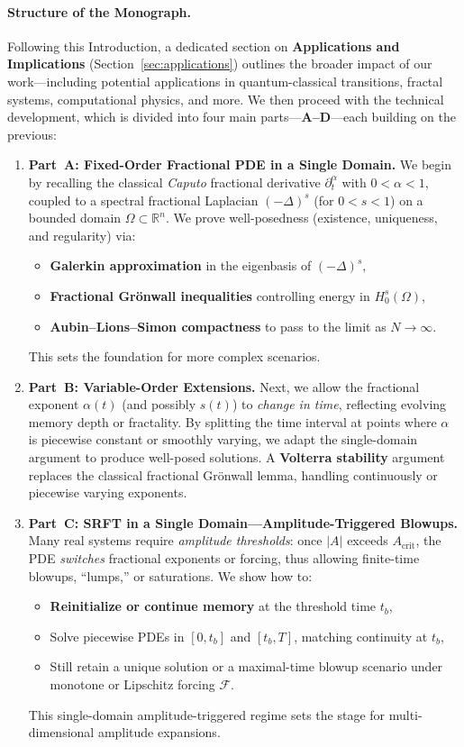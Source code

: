 \documentclass[12pt]{article}
\begin{document}
\paragraph{Structure of the Monograph.}
Following this Introduction, a dedicated section on \textbf{Applications and Implications} (Section~\ref{sec:applications}) outlines the broader impact of our work—including potential applications in quantum-classical transitions, fractal systems, computational physics, and more. We then proceed with the technical development, which is divided into four main parts—\textbf{A--D}—each building on the previous:

\begin{enumerate}
\item \textbf{Part~A: Fixed-Order Fractional PDE in a Single Domain.}
  We begin by recalling the classical \emph{Caputo} fractional derivative $\partial_t^\alpha$ 
  with $0<\alpha<1$, coupled to a spectral fractional Laplacian $(-\Delta)^s$ (for 
  $0<s<1$) on a bounded domain $\Omega\subset\mathbb{R}^n$. We prove well-posedness 
  (existence, uniqueness, and regularity) via:
  \begin{itemize}
    \item \textbf{Galerkin approximation} in the eigenbasis of $(-\Delta)^s$,
    \item \textbf{Fractional Grönwall inequalities} controlling energy in $H_0^s(\Omega)$,
    \item \textbf{Aubin--Lions--Simon compactness} to pass to the limit as $N\to\infty$.
  \end{itemize}
  This sets the foundation for more complex scenarios.

\item \textbf{Part~B: Variable-Order Extensions.}
  Next, we allow the fractional exponent $\alpha(t)$ (and possibly $s(t)$) to 
  \emph{change in time}, reflecting evolving memory depth or fractality. 
  By splitting the time interval at points where $\alpha$ is piecewise constant or 
  smoothly varying, we adapt the single-domain argument to produce well-posed solutions. 
  A \textbf{Volterra stability} argument replaces the classical fractional Grönwall lemma, 
  handling continuously or piecewise varying exponents.

\item \textbf{Part~C: SRFT in a Single Domain—Amplitude-Triggered Blowups.}
  Many real systems require \emph{amplitude thresholds}: once $|A|$ exceeds 
  $A_{\mathrm{crit}}$, the PDE \emph{switches} fractional exponents or forcing, thus 
  allowing finite-time blowups, “lumps,” or saturations. We show how to:
  \begin{itemize}
    \item \textbf{Reinitialize or continue memory} at the threshold time $t_b$,
    \item Solve piecewise PDEs in \([0,t_b]\) and \([t_b,T]\), matching continuity at $t_b$,
    \item Still retain a unique solution or a maximal-time blowup scenario under 
          monotone or Lipschitz forcing $\mathcal{F}$.
  \end{itemize}
  This single-domain amplitude-triggered regime sets the stage for multi-dimensional 
  amplitude expansions.


\end{enumerate}
\end{document}
